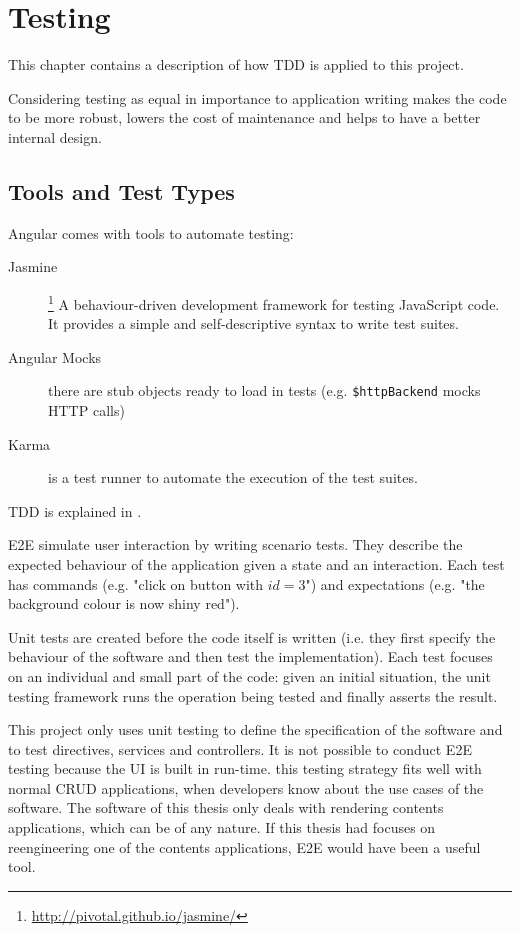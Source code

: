 \chapter{Testing}
This chapter contains a description of how \ac{TDD} is applied to this project.

Considering testing as equal in importance to application writing makes the code to be more robust, lowers the cost of maintenance and helps to have a better internal design.

\section{Tools and Test Types}
Angular comes with tools to automate testing:
\begin{description}
    \item[Jasmine]\footnote{\url{http://pivotal.github.io/jasmine/}} A behaviour-driven development framework for testing JavaScript code.
    It provides a simple and self-descriptive syntax to write test suites.
    \item[Angular Mocks] there are stub objects ready to load in tests (e.g. \texttt{\$httpBackend} mocks \ac{HTTP} calls)
    \item[Karma] is a test runner to automate the execution of the test suites. 
\end{description}

\ac{TDD} is explained in .

\ac{E2E} simulate user interaction by writing scenario tests.
They describe the expected behaviour of the application given a state and an interaction.
Each test has commands (e.g. "click on button with $id = 3$") and expectations (e.g. "the background colour is now shiny red").

Unit tests are created before the code itself is written (i.e. they first specify the behaviour of the software and then test the implementation).
Each test focuses on an individual and small part of the code: given an initial situation, the unit testing framework runs the operation being tested and finally asserts the result.

This project only uses unit testing to define the specification of the software and to test directives, services and controllers.
It is not possible to conduct \ac{E2E} testing because the \ac{UI} is built in run-time.
this testing strategy fits well with normal \ac{CRUD} applications, when developers know about the use cases of the software.
The software of this thesis only deals with rendering contents applications, which can be of any nature.
If this thesis had focuses on reengineering one of the contents applications, \ac{E2E} would have been a useful tool.

